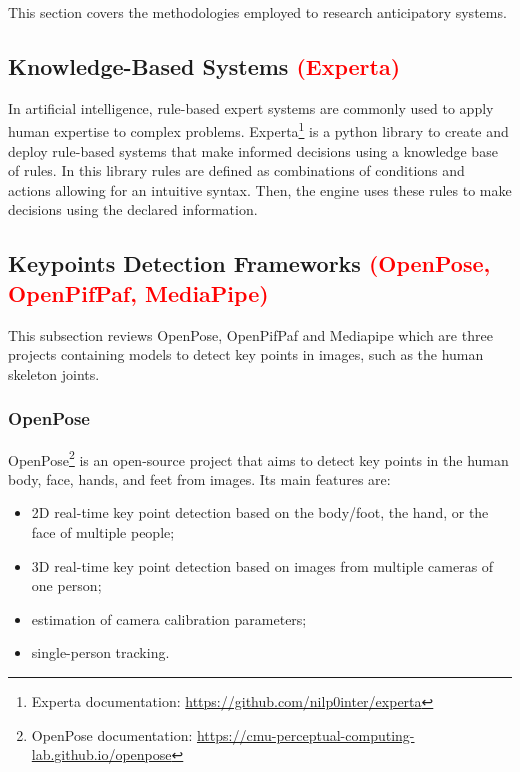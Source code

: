 This section covers the methodologies employed to research anticipatory systems.

\subsection{Knowledge-Based Systems \textcolor{red}{(Experta)}}

In artificial intelligence, rule-based expert systems are commonly used to apply human expertise to complex problems. Experta\footnote{Experta documentation: \url{https://github.com/nilp0inter/experta}} is a python library to create and deploy rule-based systems that make informed decisions using a knowledge base of rules. In this library rules are defined as combinations of conditions and actions allowing for an intuitive syntax. Then, the engine uses these rules to make decisions using the declared information.

\subsection{Keypoints Detection Frameworks \textcolor{red}{(OpenPose, OpenPifPaf, MediaPipe)}}
\label{subsection:keypointdetection}

This subsection reviews OpenPose, OpenPifPaf and Mediapipe which are three projects containing models to detect key points in images, such as the human skeleton joints.

\subsubsection{OpenPose}

OpenPose\cite{Cao2021,Simon2017,Cao2018,Wei2016}\footnote{OpenPose documentation: \url{https://cmu-perceptual-computing-lab.github.io/openpose}} is an open-source project that aims to detect key points in the human body, face, hands, and feet from images. Its main features are:

\begin{itemize}
    \item 2D real-time key point detection based on the body/foot, the hand, or the face of multiple people;
    \item 3D real-time key point detection based on images from multiple cameras of one person;
    \item estimation of camera calibration parameters;
    \item single-person tracking.
\end{itemize}

